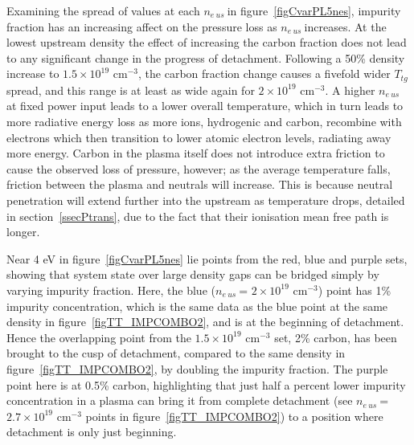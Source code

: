 \documentclass[12pt]{article}  %
\providecommand{\noNe}[1]{{${#1}\times 10^{19}$ cm$^{-3}$}} %
\providecommand{\neus}{$n_{e~us}~$} %
\providecommand{\Ttg}{$T_{tg}~$} %
\begin{document}
Examining the spread of values at each \neus in figure~\ref{figCvarPL5nes}, impurity fraction has an increasing affect on the pressure loss as \neus increases. At the lowest upstream density the effect of increasing the carbon fraction does not lead to any significant change in the progress of detachment. Following a 50\% density increase to \noNe{1.5}, the carbon fraction change causes a fivefold wider \Ttg spread, and this range is at least as wide again for \noNe{2}. A higher \neus at fixed power input leads to a lower overall temperature, which in turn leads to more radiative energy loss as more ions, hydrogenic and carbon, recombine with electrons which then transition to lower atomic electron levels, radiating away more energy. Carbon in the plasma itself does not introduce extra friction to cause the observed loss of pressure, however; as the average temperature falls, friction between the plasma and neutrals will increase. This is because neutral penetration will extend further into the upstream as temperature drops, detailed in section~\ref{ssecPtrans}, due to the fact that their ionisation mean free path is longer.

Near 4 eV in figure~\ref{figCvarPL5nes} lie points from the red, blue and purple sets, showing that system state over large density gaps can be bridged simply by varying impurity fraction. Here, the blue (\neus = \noNe{2}) point has 1\% impurity concentration, which is the same data as the blue point at the same density in figure~\ref{figTT_IMPCOMBO2}, and is at the beginning of detachment. Hence the overlapping point from the \noNe{1.5} set, 2\% carbon, has been brought to the cusp of detachment, compared to the same density in figure~\ref{figTT_IMPCOMBO2}, by doubling the impurity fraction. The purple point here is at 0.5\% carbon, highlighting that just half a percent lower impurity concentration in a plasma can bring it from complete detachment (see \neus = \noNe{2.7} points in figure~\ref{figTT_IMPCOMBO2}) to a position where detachment is only just beginning.
\end{document}
